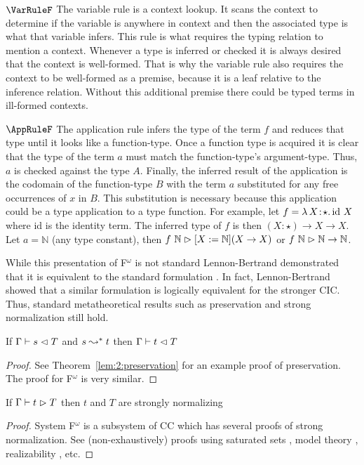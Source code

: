 $\VarRuleF$ The variable rule is a context lookup.
It scans the context to determine if the variable is anywhere in context and then the associated type is what that variable infers.
This rule is what requires the typing relation to mention a context.
Whenever a type is inferred or checked it is always desired that the context is well-formed.
That is why the variable rule also requires the context to be well-formed as a premise, because it is a leaf relative to the inference relation.
Without this additional premise there could be typed terms in ill-formed contexts.

$\AppRuleF$ The application rule infers the type of the term $f$ and reduces that type until it looks like a function-type.
Once a function type is acquired it is clear that the type of the term $a$ must match the function-type's argument-type.
Thus, $a$ is checked against the type $A$.
Finally, the inferred result of the application is the codomain of the function-type $B$ with the term $a$ substituted for any free occurrences of $x$ in $B$.
This substitution is necessary because this application could be a type application to a type function.
For example, let $f = {\lambda}\, X\! : \! \star.\, \text{id}\ X$ where id is the identity term.
The inferred type of $f$ is then $(X : \star) \to X \to X$.
Let $a = \mathbb{N}$ (any type constant), then $f\ \mathbb{N} \vartriangleright [X := \mathbb{N}](X \to X)$ or $f\ \mathbb{N} \infr \mathbb{N} \to \mathbb{N}$.

While this presentation of F$^\omega$ is not standard Lennon-Bertrand demonstrated that it is equivalent to the standard formulation \cite{lennon2021}.
In fact, Lennon-Bertrand showed that a similar formulation is logically equivalent for the stronger CIC.
Thus, standard metatheoretical results such as preservation and strong normalization still hold.

\begin{lemma}
    If $\Gamma \vdash s \vartriangleleft T$ and $s \leadsto^* t$ then $\Gamma \vdash t \vartriangleleft T$
\end{lemma}
\begin{proof}
    See Theorem~\ref{lem:2:preservation} for an example proof of preservation.
    The proof for F$^\omega$ is very similar.
\end{proof}

\begin{theorem}
    If $\Gamma \vdash t \vartriangleright T$ then $t$ and $T$ are strongly normalizing
\end{theorem}
\begin{proof}
    System F$^\omega$ is a subsystem of CC which has several proofs of strong normalization.
    See (non-exhaustively) proofs using saturated sets \cite{geuvers1994_sn_satset}, model theory \cite{terlouw1995_sn}, realizability \cite{ong1993}, etc.
\end{proof}

